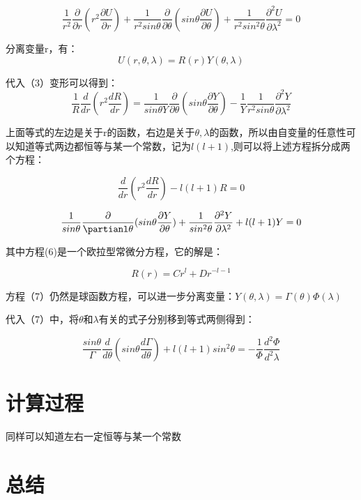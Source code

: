 \documentclass{article}
\begin{document}
    \begin{equation}
        \frac{1}{r^{2}}\frac{\partial}{\partial{r}}(r^2\frac{\partial{U}}{\partial{r}})+\frac{1}{r^2sin\theta}\frac{\partial}{\partial\theta}(sin\theta\frac{\partial{U}}{\partial\theta}) + \frac{1}{r^2sin^2\theta}\frac{\partial^{2}U}{\partial{\lambda}^2}=0
   \end{equation}
   
分离变量r，有：
     \begin{equation} 
      U(r,\theta,\lambda) = R(r)Y(\theta, \lambda)
   \end{equation}
   
代入（3）变形可以得到：
\begin{equation} 
      \frac{1}{R}\frac{d}{dr}(r^2\frac{dR}{dr}) = \frac{1}{sin\theta{Y}}\frac{\partial}{\partial\theta}(sin\theta\frac{\partial{Y}}{\partial{\theta}})-\frac{1}{Y}\frac{1}{r^2sin\theta}\frac{\partial^2Y}{\partial\lambda^2}   
   \end{equation}
   
 上面等式的左边是关于r的函数，右边是关于$\theta,\lambda$的函数，所以由自变量的任意性可以知道等式两边都恒等与某一个常数，记为$l(l+1)$,则可以将上述方程拆分成两个方程：
 
 \begin{equation}
         \frac{d}{dr}(r^2\frac{dR}{dr})-l(l+1)R=0      
 \end{equation}
 
 \begin{equation}
        \frac{1}{sin\theta}\frac{\partial}{\partianl\theta}(sin\theta\frac{\partial{Y}}{\partial\theta})+\frac{1}{sin^2\theta}\frac{\partial^2Y}{\partial\lambda^2}+l(l+1)Y=0
 \end{equation}
 
   其中方程(6)是一个欧拉型常微分方程，它的解是：
   
  \begin{equation}
      R(r)=Cr^{l} + Dr^{-l-1}
  \end{equation}
  
  方程（7）仍然是球函数方程，可以进一步分离变量：$Y(\theta,\lambda)=\Gamma(\theta)\Phi(\lambda)$

 代入（7）中，将$\theta$和$\lambda$有关的式子分别移到等式两侧得到：
 
 \begin{equation}
     \frac{sin\theta}{\Gamma}\frac{d}{d\theta}(sin\theta\frac{d\Gamma}{d\theta})+l(l+1)sin^2\theta=-\frac{1}{\Phi}\frac{d^2\Phi}{d^2\lambda}
 \end{equation}
\section{计算过程}
同样可以知道左右一定恒等与某一个常数



\section{总结}
\end{document}
